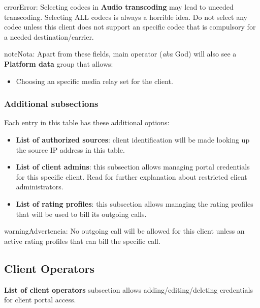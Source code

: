 \documentclass[letterpaper,10pt,spanish]{sphinxmanual}
\begin{document}
\begin{notice}{error}{Error:}
Selecting codecs in \textbf{Audio transcoding} may lead to uneeded transcoding. Selecting ALL codecs is
always a horrible idea. Do not select any codec unless this client does not support an specific codec
that is compulsory for a needed destination/carrier.
\end{notice}

\begin{notice}{note}{Nota:}
Apart from these fields, main operator (\emph{aka} God) will also see a \textbf{Platform data} group that allows:
\begin{itemize}
\item {} 
Choosing an specific media relay set for the client.

\end{itemize}
\end{notice}


\subsubsection{Additional subsections}
\label{administration_portal/brand/clients/wholesale:additional-subsections}
Each entry in this table has these additional options:
\begin{itemize}
\item {} 
\textbf{List of authorized sources}: client identification will be made looking up the source IP address in this table.

\item {} 
\textbf{List of client admins}: this subsection allows managing portal credentials for this specific client. Read {\hyperref[api_rest/acls:acls]{}}
for further explanation about restricted client administrators.

\item {} 
\textbf{List of rating profiles}: this subsection allows managing the rating profiles that will be used to bill its outgoing calls.

\end{itemize}

\begin{notice}{warning}{Advertencia:}
No outgoing call will be allowed for this client unless an active rating profiles that can
bill the specific call.
\end{notice}


\subsection{Client Operators}
\label{administration_portal/brand/clients/operators::doc}\label{administration_portal/brand/clients/operators:client-operators}\label{administration_portal/brand/clients/operators:id1}
\textbf{List of client operators} subsection allows adding/editing/deleting credentials for client portal access.
\end{document}
